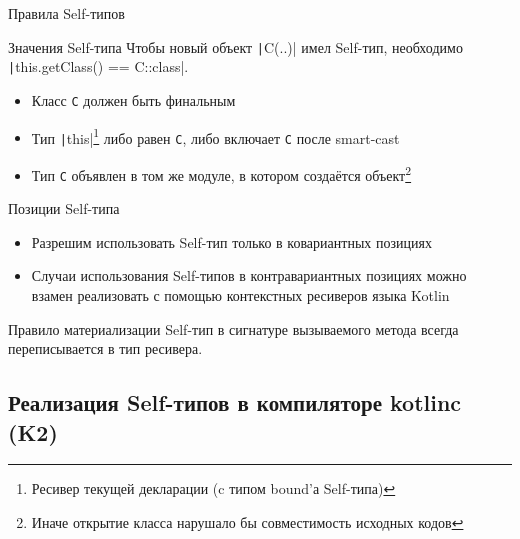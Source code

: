 \documentclass[aspectratio=169,usenames,dvipsnames]{beamer}
\begin{document}
    \begin{frame}[fragile]{Правила Self-типов}

        \begin{block}{Значения Self-типа}
            Чтобы новый объект \texttt|C(..)| имел Self-тип, необходимо \texttt|this.getClass() == C::class|.
            \begin{itemize}
                \item Класс \texttt{C} должен быть финальным
                \item Тип \texttt|this|\footnote{Ресивер текущей декларации (c типом bound'а Self-типа)} либо равен \texttt{С}, либо включает \texttt{C} после smart-cast
                \item Тип \texttt{C} объявлен в том же модуле, в котором создаётся объект\footnote{Иначе открытие класса нарушало бы совместимость исходных кодов}
            \end{itemize}
        \end{block}

        \pause

        \begin{block}{Позиции Self-типа}
            \begin{itemize}
                \item Разрешим использовать Self-тип только в ковариантных позициях
                \item Случаи использования Self-типов в контравариантных позициях можно взамен реализовать с помощью контекстных ресиверов языка Kotlin
            \end{itemize}
        \end{block}

        \pause

        \begin{block}{Правило материализации}
            Self-тип в сигнатуре вызываемого метода всегда переписывается в тип ресивера.
        \end{block}
    \end{frame}


    \subsection{Реализация Self-типов в компиляторе kotlinc (K2)}
\end{document}
